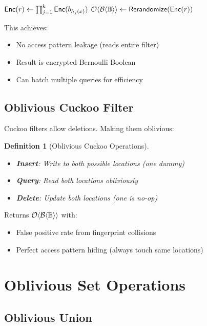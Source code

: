 \documentclass[11pt,final,hidelinks]{article}
\newcommand{\BernBool}{\mathcal{B}\langle \Bool \rangle}
\newtheorem{definition}[theorem]{Definition}
\begin{document}
\begin{algorithm}[H]
\caption{Oblivious Encrypted Bloom Filter Query}
\KwOut{$\Obv{\BernBool}$}
$\mathsf{Enc}(r) \gets \prod_{j=1}^k \mathsf{Enc}(b_{h_j(x)})$ 
$\Obv{\BernBool} \gets \mathsf{Rerandomize}(\Enc{r})$\;
\Return{$\Obv{\BernBool}$}
\end{algorithm}

This achieves:
\begin{itemize}
    \item No access pattern leakage (reads entire filter)
    \item Result is encrypted Bernoulli Boolean
    \item Can batch multiple queries for efficiency
\end{itemize}

\subsection{Oblivious Cuckoo Filter}

Cuckoo filters allow deletions. Making them oblivious:

\begin{definition}[Oblivious Cuckoo Operations]
\begin{itemize}
    \item \textbf{Insert}: Write to both possible locations (one dummy)
    \item \textbf{Query}: Read both locations obliviously
    \item \textbf{Delete}: Update both locations (one is no-op)
\end{itemize}
\end{definition}

Returns $\Obv{\BernBool}$ with:
\begin{itemize}
    \item False positive rate from fingerprint collisions
    \item Perfect access pattern hiding (always touch same locations)
\end{itemize}

\section{Oblivious Set Operations}

\subsection{Oblivious Union}
\end{document}
